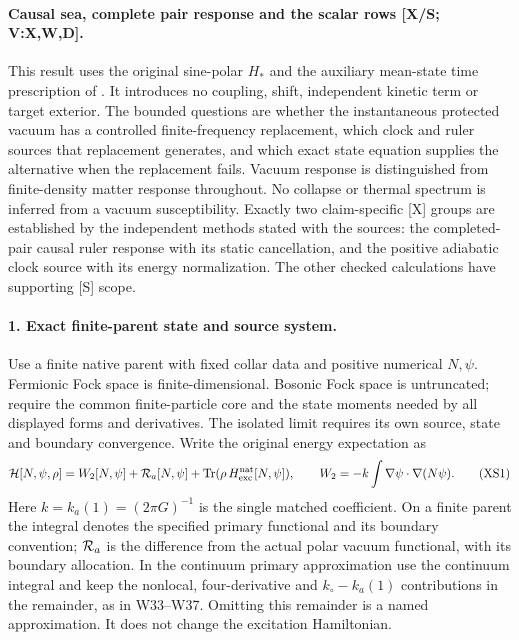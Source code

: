 \documentclass[11pt]{article}
\DeclareMathOperator{\Tr}{Tr}
\begin{document}
\paragraph{Causal sea, complete pair response and the scalar rows
[X/S; V:X,W,D].}
This result uses the original sine-polar $H_*$ and the auxiliary
mean-state time prescription of .
It introduces no coupling, shift, independent kinetic term or
target exterior.  The bounded questions are whether the
instantaneous protected vacuum has a controlled finite-frequency
replacement, which clock and ruler sources that replacement
generates, and which exact state equation supplies the alternative
when the replacement fails.  Vacuum response is distinguished from
finite-density matter response throughout.  No collapse or thermal
spectrum is inferred from a vacuum susceptibility.
Exactly two claim-specific [X] groups are established by the
independent methods stated with the sources: the completed-pair
causal ruler response with its static cancellation, and the
positive adiabatic clock source with its energy normalization.
The other checked calculations have supporting [S] scope.

\paragraph{1. Exact finite-parent state and source system.}
Use a finite native parent with fixed collar data and positive
numerical $N,\psi$.  Fermionic Fock space is finite-dimensional.
Bosonic Fock space is untruncated; require the common finite-particle
core and the state moments needed by all displayed forms and
derivatives.  The isolated limit requires its own source,
state and boundary convergence.
Write the original energy expectation as
\begin{equation}
 {\cal H}[N,\psi,\rho]
 =W_2[N,\psi]+{\cal R}_a[N,\psi]
       +\Tr(\rho\,H_{\rm exc}^{\rm nat}[N,\psi]),
 \qquad
 W_2=-k\int\nabla\psi\cdot\nabla(N\psi).
 \tag{XS1}
\end{equation}
Here $k=k_a(1)=(2\pi G)^{-1}$ is the single matched coefficient.
On a finite parent the integral denotes the specified primary
functional and its boundary convention; ${\cal R}_a$ is the
difference from the actual polar vacuum functional, with its
boundary allocation.  In the continuum primary approximation
use the continuum integral and keep the nonlocal,
four-derivative and $k_\circ-k_a(1)$ contributions in the remainder,
as in W33--W37.  Omitting this remainder is a named approximation.
It does not change the excitation Hamiltonian.
\end{document}
